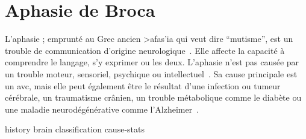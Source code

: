 \section{Aphasie de Broca}

L'aphasie ; emprunté au Grec ancien \textgreek{>afas'ia} qui veut dire ``mutisme'',
est un trouble de communication d'origine neurologique~\cite{Larousse}. 
Elle affecte la capacité à comprendre le langage, s'y exprimer ou les deux.
L'aphasie n'est pas causée par un trouble moteur, sensoriel, psychique ou intellectuel~\cite{Chapey_2008}.
Sa cause principale est un \gls{avc}, 
mais elle peut également être le résultat d'une infection ou tumeur cérébrale, 
un traumatisme crânien, un trouble métabolique comme le diabète 
ou une maladie neurodégénérative comme l'Alzheimer~\cite{Hallowell_2017}.

{history}
{brain}
{classification}
{cause-stats}